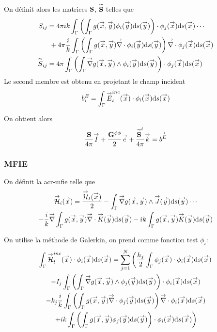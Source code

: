       On définit alors les matrices \(\mS\), \(\mSt\) telles que
      \begin{align}
        S_{ij} 
          &= 4\pi ik \int_\Gamma \left( \int_\Gamma g(\vx,\vy) \phi_i(\vy) \dd{s}(\vy) \right) \cdot \phi_j (\vx)\dd{s}(\vx) \cdots\\
          &~+ 4\pi \frac{i}{k}\int_\Gamma \left( \int_\Gamma g(\vx,\vy) \vdiv \phi_i (\vy) \dd{s}(\vy) \right) \vdiv \phi_j(\vx)\dd{s}(\vx)\\ 
        \tilde{S}_{ij} 
          &= 4\pi \int_\Gamma \left( \int_\Gamma \vgrad g(\vx,\vy) \pvect \phi_i(\vy) \dd{s}(\vy) \right) \cdot \phi_j(\vx)\dd{s}(\vx)
      \end{align}
      Le second membre est obtenu en projetant le champ incident 
      \begin{equation}
        b_i^E = \int_\Gamma \vE^{inc}_t(\vx) \cdot \phi_i(\vx)\dd{s}(\vx)
      \end{equation}

      On obtient alors 
      \begin{equation}
        \frac{\mS}{4\pi}\vect{I}
        + \frac{\mG{\phi}{\phi}}{2}\vect{e}
        + \frac{\mSt^t}{4\pi}\vect{k}
        = \vect{b^E}
      \end{equation}
    
    \subsubsection{MFIE}
      On définit la \gls{acr-mfie} telle que
      \begin{multline}
        \label{eq:form_int:EFIE}
        \vH_i(\vx) = 
        \frac{\vH_t(\vx)}{2} 
          - \int_\Gamma \vgrad g(\vx,\vy) \pvect \vJ(\vy) \dd{s}(\vy) \cdots \\
        - \frac{i}{k} \vgrad \int_\Gamma  g(\vx,\vy)\vdiv\vK(\vy)\dd{s}(\vy) 
          - ik \int_\Gamma g(\vx,\vy)\vK(\vy)\dd{s}(\vy)
      \end{multline}
      
      On utilise la méthode de Galerkin, on prend comme fonction test \(\phi_i\): 
      \begin{multline}
        \int_\Gamma \vH^{inc}_t(\vx) \cdot \phi_i(\vx) \dd{s}(\vx) = \sum_{j=1}^{N} \left(
          \frac{h_j}{2}\int_\Gamma \phi_j(\vx) \cdot \phi_i(\vx) \dd{s}(\vx) \right. \\
          -  I_j\int_\Gamma  \left(\int_\Gamma \vgrad g(\vx,\vy) \pvect \phi_j(\vy) \dd{s}(\vy) \right) \cdot \phi_i(\vx) \dd{s}(\vx) \\
          - k_j\frac{i}{k} \int_\Gamma \left(\int_\Gamma g(\vx,\vy)\vdiv \phi_j(\vy) \dd{s}(\vy) \right) \vdiv \phi_i(\vx) \dd{s}(\vx) \\
        \left.
          + ik\int_\Gamma \left(\int_\Gamma g(\vx,\vy)\phi_j(\vy)\dd{s}{(\vy)}\right)\cdot \phi_i(\vx)\dd{s}(\vx)
        \right)
      \end{multline}

